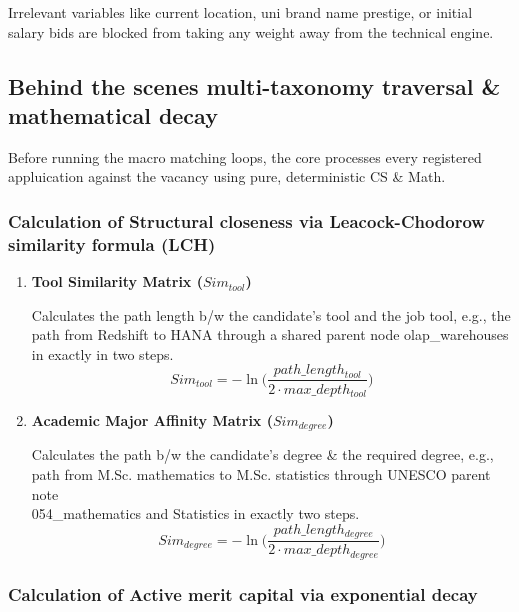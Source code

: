 \documentclass[a4paper, 12pt]{article}
\begin{document}
Irrelevant variables like current location, uni brand name prestige, or initial salary bids are blocked from taking any weight away from the technical engine.

\subsection{Behind the scenes multi-taxonomy traversal \& mathematical decay}

Before running the macro matching loops, the core processes every registered appluication against the vacancy using pure, deterministic CS \& Math.

\subsubsection{Calculation of Structural closeness via Leacock-Chodorow similarity formula (LCH)}
\begin{enumerate}[label=(\roman*)]
    \item \textbf{Tool Similarity Matrix ($Sim_{tool}$)}
    
    Calculates the path length b/w the candidate's tool and the job tool, e.g., the path from Redshift to HANA through a shared parent node olap\_warehouses in exactly in two steps.
        \begin{equation}
            Sim_{tool} = -\ln  \biggl( \frac{path\_length_{tool}}{2 \cdot max\_depth_{tool}} \biggr)
        \end{equation}

    \item \textbf{Academic Major Affinity Matrix ($Sim_{degree}$)}
    
    Calculates the path b/w the candidate's degree \& the required degree, e.g., path from M.Sc. mathematics to M.Sc. statistics through UNESCO parent note \\ 054\_mathematics and Statistics in exactly two steps.
        \begin{equation}
            Sim_{degree} = -\ln  \biggl( \frac{path\_length_{degree}}{2 \cdot max\_depth_{degree}} \biggr)
        \end{equation}

\end{enumerate}

\subsubsection{Calculation of Active merit capital via exponential decay}
\end{document}

